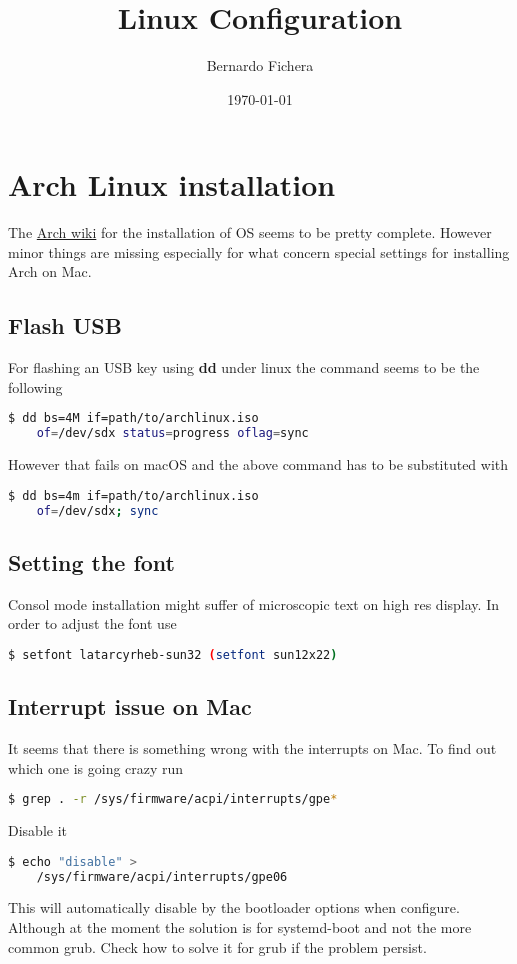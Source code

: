 \documentclass[12pt]{article}
\title{Linux Configuration}
\author{Bernardo Fichera}
\date{\today}
\begin{document}
\maketitle

\section*{Arch Linux installation}
The \href{https://wiki.archlinux.org/index.php/Installation_guide}{Arch wiki} for the installation of OS seems to be pretty complete. However minor things are missing especially for what concern special settings for installing Arch on Mac.

\subsection*{Flash USB}
For flashing an USB key using \textbf{dd} under linux the command seems to be the following
\begin{lstlisting}[language=bash]
    $ dd bs=4M if=path/to/archlinux.iso 
    of=/dev/sdx status=progress oflag=sync
\end{lstlisting}
However that fails on macOS and the above command has to be substituted with
\begin{lstlisting}[language=bash]
    $ dd bs=4m if=path/to/archlinux.iso 
    of=/dev/sdx; sync
\end{lstlisting}

\subsection*{Setting the font}
Consol mode installation might suffer of microscopic text on high res display. In order to adjust the font use
\begin{lstlisting}[language=bash]
    $ setfont latarcyrheb-sun32 (setfont sun12x22)
\end{lstlisting}

\subsection*{Interrupt issue on Mac}
It seems that there is something wrong with the interrupts on Mac. To find out which one is going crazy run
\begin{lstlisting}[language=bash]
    $ grep . -r /sys/firmware/acpi/interrupts/gpe*
\end{lstlisting}
Disable it
\begin{lstlisting}[language=bash]
    $ echo "disable" > 
    /sys/firmware/acpi/interrupts/gpe06
\end{lstlisting}
This will automatically disable by the bootloader options when configure. Although at the moment the solution is for systemd-boot and not the more common grub. Check how to solve it for grub if the problem persist.
\end{document}
